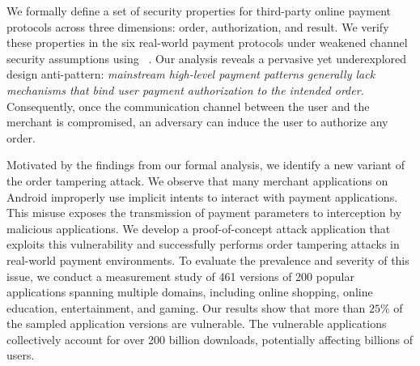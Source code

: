 We formally define a set of security properties for third-party online payment protocols across three dimensions: order, authorization, and result.
We verify these properties in the six real-world payment protocols under weakened channel security assumptions using \Tamarin~\cite{Meier2013TAMARINProver}.
Our analysis reveals a pervasive yet underexplored design anti-pattern: \emph{mainstream high-level payment patterns generally lack mechanisms that bind user payment authorization to the intended order.}
Consequently, once the communication channel between the user and the merchant is compromised, an adversary can induce the user to authorize any order.

Motivated by the findings from our formal analysis, we identify a new variant of the order tampering attack.
We observe that many merchant applications on Android improperly use implicit intents to interact with payment applications.
This misuse exposes the transmission of payment parameters to interception by malicious applications.
We develop a proof-of-concept attack application that exploits this vulnerability and successfully performs order tampering attacks in real-world payment environments.
To evaluate the prevalence and severity of this issue, we conduct a measurement study of 461 versions of 200 popular applications spanning multiple domains, including online shopping, online education, entertainment, and gaming.
Our results show that more than $25\%$ of the sampled application versions are vulnerable.
The vulnerable applications collectively account for over 200 billion downloads, potentially affecting billions of users.


